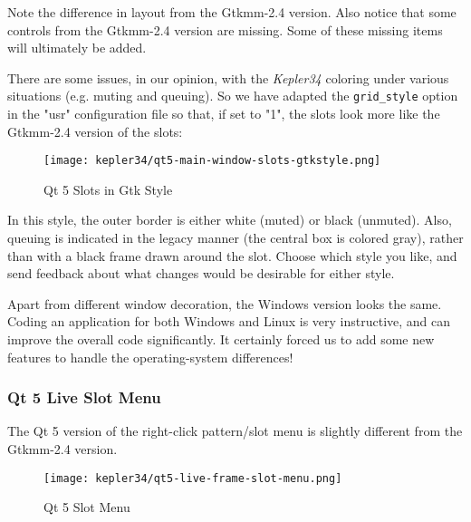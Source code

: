    Note the difference in layout from the Gtkmm-2.4 version.
   Also notice that some controls from the Gtkmm-2.4 version are missing.
   Some of these missing items will ultimately be added.

   There are some issues, in our opinion, with the \textsl{Kepler34} coloring
   under various situations (e.g. muting and queuing).  So we have adapted the
   \texttt{grid\_style} option in the "usr" configuration file so that, if set
   to "1", the slots look more like the Gtkmm-2.4 version of the slots:

\begin{figure}[H]
   \centering 
   \texttt{[image: kepler34/qt5-main-window-slots-gtkstyle.png]}
   \caption{Qt 5 Slots in Gtk Style}
   \label{fig:qt5_main_window_slots_gtkstyle}
\end{figure}

   In this style, the outer border is either white (muted) or black (unmuted).
   Also, queuing is indicated in the legacy manner (the central box is colored
   gray), rather than with a black frame drawn around the slot.
   Choose which style you like, and send feedback about what changes would
   be desirable for either style.

%

   Apart from different window decoration, the Windows version looks
   the same.  Coding an application for both Windows and Linux is very
   instructive, and can improve the overall code significantly.  It certainly
   forced us to add some new features to handle the operating-system
   differences!

\subsubsection{Qt 5 Live Slot Menu}
\label{subsubsec:qt_portmidi_qt5_live_slot_menu}

   The Qt 5 version of the right-click pattern/slot menu is slightly different
   from the Gtkmm-2.4 version.

\begin{figure}[H]
   \centering 
   \texttt{[image: kepler34/qt5-live-frame-slot-menu.png]}
   \caption{Qt 5 Slot Menu}
   \label{fig:qt5_main_window_slot_menu}
\end{figure}

